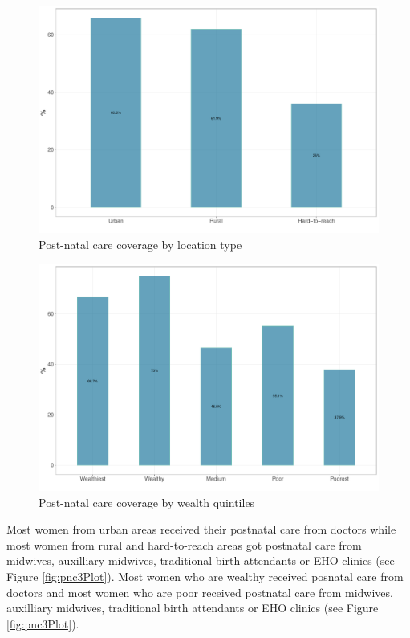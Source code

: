 \documentclass[12pt,a4paper]{article}
\begin{document}
\begin{figure}[H]

{\centering \includegraphics{kayinReport_files/figure-latex/pnc1Plot-1} 

}

\caption{Post-natal care coverage by location type}\label{fig:pnc1Plot}
\end{figure}

\begin{figure}[H]

{\centering \includegraphics{kayinReport_files/figure-latex/pnc2Plot-1} 

}

\caption{Post-natal care coverage by wealth quintiles}\label{fig:pnc2Plot}
\end{figure}

Most women from urban areas received their postnatal care from doctors while most women from rural and hard-to-reach areas got postnatal care from midwives, auxilliary midwives, traditional birth attendants or EHO clinics (see Figure \ref{fig:pnc3Plot}). Most women who are wealthy received posnatal care from doctors and most women who are poor received postnatal care from midwives, auxilliary midwives, traditional birth attendants or EHO clinics (see Figure \ref{fig:pnc3Plot}).
\end{document}
